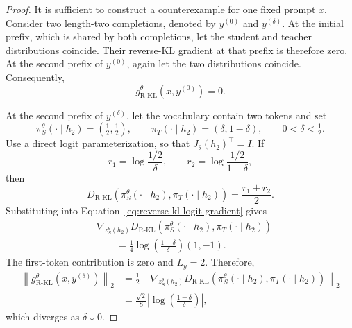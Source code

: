 \documentclass{article} %
\theoremstyle{plain}
\theoremstyle{definition}
\theoremstyle{remark}
\begin{document}
\begin{proof}
It is sufficient to construct a counterexample for one fixed prompt $x$.
Consider two length-two completions, denoted by $y^{(0)}$ and
$y^{(\delta)}$.  At the initial prefix, which is shared by both completions,
let the student and teacher distributions coincide.  Their reverse-KL gradient
at that prefix is therefore zero.  At the second prefix of $y^{(0)}$, again let
the two distributions coincide.  Consequently,
\begin{equation}
    g_{\mathrm{R\text{-}KL}}^\theta(x,y^{(0)})=0.
    \label{eq:reverse-zero-trajectory}
\end{equation}

At the second prefix of $y^{(\delta)}$, let the vocabulary contain two tokens
and set
\begin{equation}
    \pi_S^\theta(\cdot\mid h_2)
    =\left(\tfrac12,\tfrac12\right),
    \qquad
    \pi_T(\cdot\mid h_2)
    =(\delta,1-\delta),
    \qquad 0<\delta<\tfrac12.
    \label{eq:reverse-counterexample-distributions}
\end{equation}
Use a direct logit parameterization, so that
$J_\theta(h_2)^\top=I$.  If
\begin{equation}
    r_1=\log\frac{1/2}{\delta},
    \qquad
    r_2=\log\frac{1/2}{1-\delta},
\end{equation}
then
\begin{equation}
    D_{\mathrm{R\text{-}KL}}\left(
        \pi_S^\theta(\cdot\mid h_2),
        \pi_T(\cdot\mid h_2)
    \right)
    =\frac{r_1+r_2}{2}.
\end{equation}
Substituting into Equation~\ref{eq:reverse-kl-logit-gradient} gives
\begin{align}
    &\nabla_{z_S^\theta(h_2)}
    D_{\mathrm{R\text{-}KL}}\left(
        \pi_S^\theta(\cdot\mid h_2),
        \pi_T(\cdot\mid h_2)
    \right)\nonumber\\
    &\qquad=
    \frac14
    \log\left(\frac{1-\delta}{\delta}\right)(1,-1).
    \label{eq:reverse-counterexample-logit-gradient}
\end{align}
The first-token contribution is zero and $L_y=2$.  Therefore,
\begin{align}
    \left\lVert
        g_{\mathrm{R\text{-}KL}}^\theta(x,y^{(\delta)})
    \right\rVert_2
    &=
    \frac12
    \left\lVert
        \nabla_{z_S^\theta(h_2)}
        D_{\mathrm{R\text{-}KL}}\left(
            \pi_S^\theta(\cdot\mid h_2),
            \pi_T(\cdot\mid h_2)
        \right)
    \right\rVert_2\\
    &=
    \frac{\sqrt2}{8}
    \left|\log\left(\frac{1-\delta}{\delta}\right)\right|,
    \label{eq:reverse-counterexample-trajectory-gradient}
\end{align}
which diverges as $\delta\downarrow0$.


\end{proof}
\end{document}
